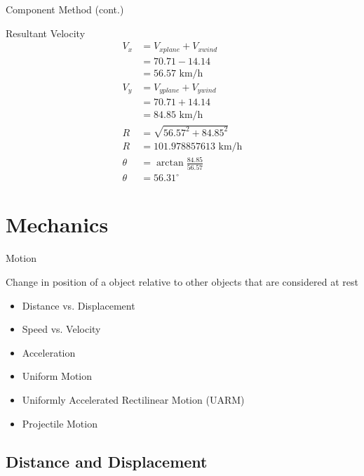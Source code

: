 \documentclass{beamer}
\begin{document}
\begin{frame}{Component Method (cont.)}

	Resultant Velocity
	\begin{align*}
		V_x &= V_{xplane} + V_{xwind} \\
		&= 70.71 - 14.14 \\
		& = 56.57 \text{ km/h} \\
		V_y &= V_{yplane} + V_{ywind} \\
		&= 70.71 + 14.14 \\
		&= 84.85 \text{ km/h}\\
		R &= \sqrt{56.57^2 + 84.85^2} \\
		R &= 101.978857613  \text{ km/h}\\
		\theta &= \arctan{\frac{84.85}{56.57}} \\
		\theta &= 56.31^\circ
	\end{align*}
\end{frame}




\section{Mechanics}

\begin{frame}{Motion}
	\begin{definition}
		Change in position of a object relative to other objects that are considered at rest
	\end{definition}
	\vfil
	\begin{itemize}
		\item Distance vs. Displacement
		\item Speed vs. Velocity
		\item Acceleration
		\item Uniform Motion
		\item Uniformly Accelerated Rectilinear Motion (UARM)
		\item Projectile Motion
	\end{itemize}
\end{frame}




\subsection{Distance and Displacement}
\end{document}
